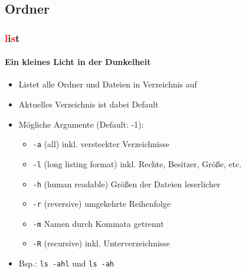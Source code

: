\documentclass[12pt,utf8]{beamer}
\begin{document}
\subsection{Ordner}
\begin{frame}
\frametitle{\textcolor{red}{l}i\textcolor{red}{s}t}
\framesubtitle{\textcolor{ownDarkOr}{Ein kleines Licht in der Dunkelheit}}
\begin{itemize}
	\item Listet alle Ordner und Dateien in Verzeichnis auf
	\item Aktuelles Verzeichnis ist dabei Default
	\item Mögliche Argumente (Default: -1):
	\begin{itemize}[<+->]
		\item \texttt{-a}  (all) inkl. versteckter Verzeichnisse
		\item \texttt{-l}  (long listing format) inkl. Rechte, Besitzer, Größe, etc.
		\item \texttt{-h}  (human readable) Größen der Dateien leserlicher
		\item \texttt{-r}  (reversive) umgekehrte Reihenfolge
		\item \texttt{-m}  Namen durch Kommata getrennt
		\item \texttt{-R}  (recursive) inkl. Unterverzeichnisse
	\end{itemize}
	\item Bsp.: \texttt{ls -ahl} und \texttt{ls -ah}
\end{itemize}
\end{frame}
\end{document}
